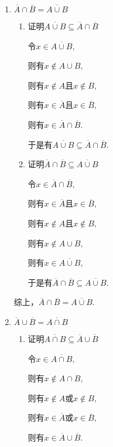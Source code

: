 \documentclass[8pt]{article}
\begin{document}
				\begin{enumerate}[label=(\arabic*)]
					\item $\overline{A}\cap\overline{B}=\overline{A\cup B}$

						\begin{enumerate}[label=$\arabic*^{\circ}$]
							\item 证明$\overline{A\cup B}\subseteq\overline{A}\cap\overline{B}$

								令$x\in\overline{A\cup B},$

								则有$x\notin A\cup B,$

								则有$x\notin A$且$x\notin B,$

								则有$x\in \overline{A}$且$x\in \overline{B},$

								则有$x\in\overline{A}\cap\overline{B}.$

								于是有$\overline{A\cup B}\subseteq\overline{A}\cap\overline{B}$.

							\item 证明$\overline{A}\cap\overline{B}\subseteq\overline{A\cup B}$

								令$x\in\overline{A}\cap\overline{B},$

								则有$x\in\overline{A}$且$x\in\overline{B},$

								则有$x\notin A$且$x\notin B,$

								则有$x\notin A\cup B,$

								则有$x\in \overline{A\cup B},$

								于是有$\overline{A}\cap\overline{B}\subseteq\overline{A\cup B}$.

						\end{enumerate}

						综上，$\overline{A}\cap\overline{B}=\overline{A\cup B}$.

					\item $\overline{A}\cup\overline{B}=\overline{A\cap B}$

						\begin{enumerate}[label=$\arabic*^{\circ}$]
							\item 证明$\overline{A\cap B}\subseteq\overline{A}\cup\overline{B}$

								令$x\in\overline{A\cap B},$

								则有$x\notin A\cap B,$

								则有$x\notin A$或$x\notin B,$

								则有$x\in \overline{A}$或$x\in \overline{B},$

								则有$x\in\overline{A}\cup\overline{B}.$


\end{enumerate}
\end{enumerate}
\end{document}
